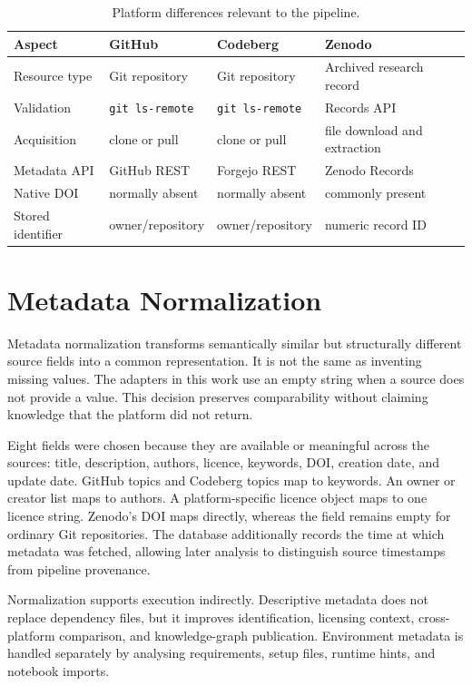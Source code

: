 \begin{table}[ht]
\centering
\caption{Platform differences relevant to the pipeline.}
\label{tab:platform-differences}
\begin{tabularx}{\textwidth}{@{}lXXX@{}}
\toprule
Aspect & GitHub & Codeberg & Zenodo\\
\midrule
Resource type & Git repository & Git repository & Archived research record\\
Validation & \texttt{git ls-remote} & \texttt{git ls-remote} & Records API\\
Acquisition & clone or pull & clone or pull & file download and extraction\\
Metadata API & GitHub REST & Forgejo REST & Zenodo Records\\
Native DOI & normally absent & normally absent & commonly present\\
Stored identifier & owner/repository & owner/repository & numeric record ID\\
\bottomrule
\end{tabularx}
\end{table}

\section{Metadata Normalization}

Metadata normalization transforms semantically similar but structurally different source fields into a common representation. It is not the same as inventing missing values. The adapters in this work use an empty string when a source does not provide a value. This decision preserves comparability without claiming knowledge that the platform did not return.

Eight fields were chosen because they are available or meaningful across the sources: title, description, authors, licence, keywords, DOI, creation date, and update date. GitHub topics and Codeberg topics map to keywords. An owner or creator list maps to authors. A platform-specific licence object maps to one licence string. Zenodo's DOI maps directly, whereas the field remains empty for ordinary Git repositories. The database additionally records the time at which metadata was fetched, allowing later analysis to distinguish source timestamps from pipeline provenance.

Normalization supports execution indirectly. Descriptive metadata does not replace dependency files, but it improves identification, licensing context, cross-platform comparison, and knowledge-graph publication. Environment metadata is handled separately by analysing requirements, setup files, runtime hints, and notebook imports.

